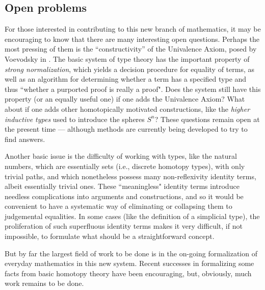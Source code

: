 {\subsection*{Open problems} 

For those interested in contributing to this new branch of mathematics, it may be encouraging to know that there are many interesting open questions.  Perhaps the most pressing of them is the ``constructivity'' of the Univalence Axiom, posed by Voevodsky in \cite{Vo2012}.  The basic system of type theory has the important property of \emph{strong normalization}, which yields a decision procedure for equality of terms, as well as an algorithm for determining whether a term has a specified type and thus ``whether a purported proof is really a proof".  Does the system still have this property (or an equally useful one) if one adds the Univalence Axiom?  What about if one adds other homotopically motivated constructions, like the \emph{higher inductive types} used to introduce the spheres $S^n$?  These questions remain open at the present time --- although methods are currently being developed to try to find answers.

Another basic issue is the difficulty of working with types, like the natural numbers, which are essentially sets (i.e., discrete homotopy types), with only trivial paths, and which nonetheless possess many non-reflexivity identity terms, albeit essentially trivial ones.  These ``meaningless" identity terms introduce needless complications into arguments and constructions, and so it would be convenient to have a systematic way of eliminating or collapsing them to judgemental equalities.  In some cases (like the definition of a simplicial type), the proliferation of such superfluous identity terms makes it very difficult, if not impossible, to formulate what should be a straightforward concept.

But by far the largest field of work to be done is in the on-going formalization of everyday mathematics in this new system.  Recent successes in formalizing some facts from basic homotopy theory have been encouraging, but, obviously, much work remains to be done.

%

}%

